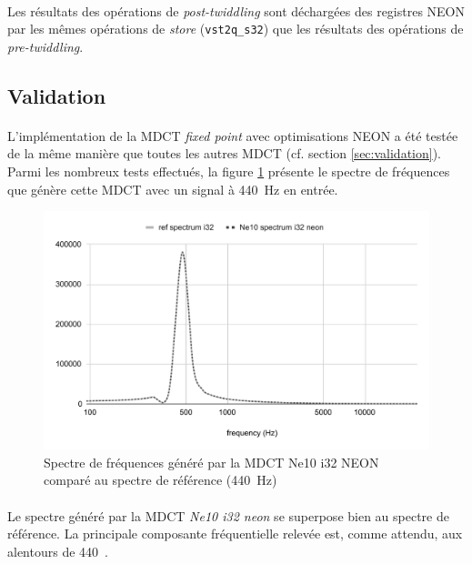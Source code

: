 \documentclass{article}
\begin{document}
    \paragraph{}
    Les résultats des opérations de \emph{post-twiddling} sont déchargées des registres NEON par les mêmes opérations de \emph{store} (\texttt{vst2q\_s32}) que les résultats des opérations de \emph{pre-twiddling}.


    \subsection{Validation}

    \paragraph{}
    L'implémentation de la MDCT \emph{fixed point} avec optimisations NEON a été testée de la même manière que toutes les autres MDCT (cf. section \ref{sec:validation}). Parmi les nombreux tests effectués, la figure \ref{fig:validation_ne10_i32_neon} présente le spectre de fréquences que génère cette MDCT avec un signal à \SI{440}{\hertz} en entrée.
    \begin{figure}[H]
        \centering
        \includegraphics[width=.8\linewidth]{./images/validation_ne10_i32_neon.pdf}
        \caption{Spectre de fréquences généré par la MDCT Ne10 i32 NEON comparé au spectre de référence (\SI{440}{\hertz})}
        \label{fig:validation_ne10_i32_neon}
    \end{figure}

    \paragraph{}
    Le spectre généré par la MDCT \emph{Ne10 i32 neon} se superpose bien au spectre de référence. La principale composante fréquentielle relevée est, comme attendu, aux alentours de \SI{440}{\hertz.}
\end{document}
